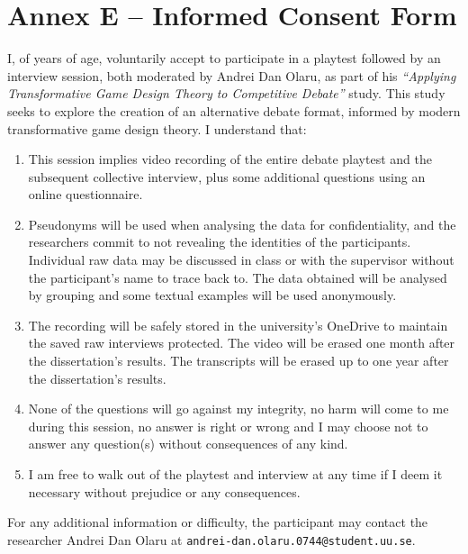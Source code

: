
\newpage
\section*{Annex E -- Informed Consent Form}

\bigskip

I, \underline{\hspace{7cm}} of \underline{\hspace{1.5cm}} years of age, voluntarily accept to participate in a playtest followed by an interview session, both moderated by Andrei Dan Olaru, as part of his \textit{``Applying Transformative Game Design Theory to Competitive Debate''} study. This study seeks to explore the creation of an alternative debate format, informed by modern transformative game design theory. I understand that:

\begin{enumerate}
    \item This session implies video recording of the entire debate playtest and the subsequent collective interview, plus some additional questions using an online questionnaire.
    \item Pseudonyms will be used when analysing the data for confidentiality, and the researchers commit to not revealing the identities of the participants. Individual raw data may be discussed in class or with the supervisor without the participant's name to trace back to. The data obtained will be analysed by grouping and some textual examples will be used anonymously.
    \item The recording will be safely stored in the university's OneDrive to maintain the saved raw interviews protected. The video will be erased one month after the dissertation's results. The transcripts will be erased up to one year after the dissertation's results.
    \item None of the questions will go against my integrity, no harm will come to me during this session, no answer is right or wrong and I may choose not to answer any question(s) without consequences of any kind.
    \item I am free to walk out of the playtest and interview at any time if I deem it necessary without prejudice or any consequences.
\end{enumerate}

For any additional information or difficulty, the participant may contact the researcher Andrei Dan Olaru at \texttt{andrei-dan.olaru.0744@student.uu.se}.

